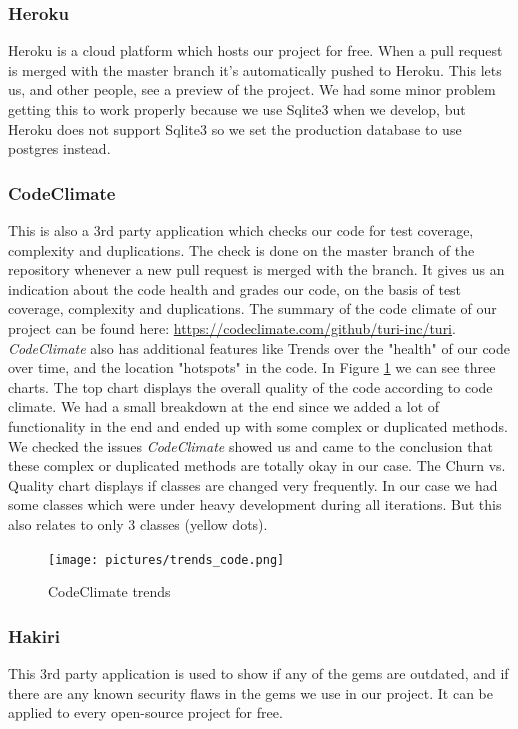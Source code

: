 \documentclass[a4paper]{article}
\begin{document}
\subsubsection{Heroku}
Heroku is a cloud platform which hosts our project for free. When a pull request is merged with the master branch it's automatically pushed to Heroku. This lets us, and other people, see a preview of the project. We had some minor problem getting this to work properly because we use Sqlite3 when we develop, but Heroku does not support Sqlite3 so we set the production database to use postgres instead.

\subsubsection{CodeClimate}
This is also a 3rd party application which checks our code for test coverage, complexity and duplications. The check is done on the master branch of the repository whenever a new pull request is merged with the branch. It gives us an indication about the code health and grades our code, on the basis of test coverage, complexity and duplications. The summary of the code climate of our project can be found here: \url{https://codeclimate.com/github/turi-inc/turi}. \\
\textit{CodeClimate} also has additional features like Trends over the "health" of our code over time, and the location "hotspots" in the code. In Figure \ref{fig:codeclimate} we can see three charts. The top chart displays the overall quality of the code according to code climate. We had a small breakdown at the end since we added a lot of functionality in the end and ended up with some complex or duplicated methods. We checked the issues \textit{CodeClimate} showed us and came to the conclusion that these complex or duplicated methods are totally okay in our case. The Churn vs. Quality chart displays if classes are changed very frequently. In our case we had some classes which were under heavy development during all iterations. But this also relates to only 3 classes (yellow dots).

\begin{figure}[!h]
  \begin{center}
    \texttt{[image: pictures/trends\_code.png]}
    \caption{CodeClimate trends}
    \label{fig:codeclimate}
  \end{center}
\end{figure}

\subsubsection{Hakiri}
This 3rd party application is used to show if any of the gems are outdated, and if there are any known security flaws in the gems we use in our project. It can be applied to every open-source project for free.
\end{document}
